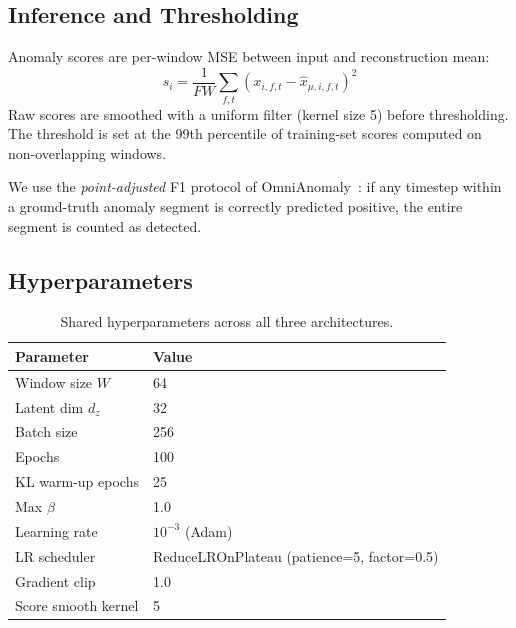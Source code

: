 \documentclass[10pt,twocolumn]{article}
\begin{document}
\subsection{Inference and Thresholding}

Anomaly scores are per-window MSE between input and reconstruction mean:
\begin{equation}
  s_i = \frac{1}{FW} \sum_{f,t} (x_{i,f,t} - \hat{x}_{\mu,i,f,t})^2
\end{equation}
Raw scores are smoothed with a uniform filter (kernel size 5) before
thresholding. The threshold is set at the 99th percentile of training-set scores
computed on non-overlapping windows.

We use the \emph{point-adjusted} F1 protocol of OmniAnomaly~\cite{su2019robust}:
if any timestep within a ground-truth anomaly segment is correctly predicted
positive, the entire segment is counted as detected.

\subsection{Hyperparameters}

\begin{table}[h]
\centering
\caption{Shared hyperparameters across all three architectures.}
\label{tab:shared_hp}
\begin{tabular}{ll}
\toprule
Parameter & Value \\
\midrule
Window size $W$ & 64 \\
Latent dim $d_z$ & 32 \\
Batch size & 256 \\
Epochs & 100 \\
KL warm-up epochs & 25 \\
Max $\beta$ & 1.0 \\
Learning rate & $10^{-3}$ (Adam) \\
LR scheduler & ReduceLROnPlateau (patience=5, factor=0.5) \\
Gradient clip & 1.0 \\
Score smooth kernel & 5 \\
\bottomrule
\end{tabular}
\end{table}
\end{document}
